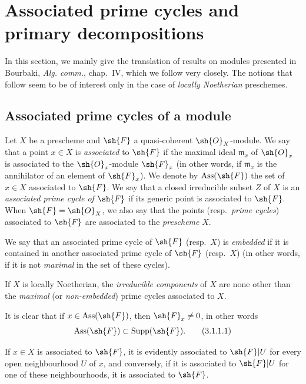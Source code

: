 \section{Associated prime cycles and primary decompositions}
\label{section:IV.3}


In this section, we mainly give the translation of results on modules presented in Bourbaki, \emph{Alg. comm.}, chap.~IV, which we follow very closely.
The notions that follow seem to be of interest only in the case of \emph{locally Noetherian} preschemes.

\subsection{Associated prime cycles of a module}
\label{subsection:IV.3.1}

\begin{definition}[3.1.1]
\label{IV.3.1.1}
Let $X$ be a prescheme and $\sh{F}$ a quasi-coherent $\sh{O}_X$-module.
We say that a point $x\in X$ is \emph{associated} to $\sh{F}$ if the maximal ideal $\mathfrak{m}_x$ of $\sh{O}_x$ is associated to the $\sh{O}_x$-module $\sh{F}_x$ (in other words, if $\mathfrak{m}_x$ is the annihilator of an element of $\sh{F}_x$).
We denote by $\operatorname{Ass}(\sh{F})$ the set of $x\in X$ associated to $\sh{F}$.
We say that a closed irreducible subset $Z$ of $X$ is an \emph{associated prime cycle of $\sh{F}$} if its generic point is associated to $\sh{F}$.
When $\sh{F}=\sh{O}_X$, we also say that the points (resp.\ \emph{prime cycles}) associated to $\sh{F}$ are associated to the \emph{prescheme} $X$.
\end{definition}

We say that an associated prime cycle of $\sh{F}$ (resp.\ $X$) is \emph{embedded} if it is contained in another associated prime cycle of $\sh{F}$ (resp.\ $X$) (in other words, if it is not \emph{maximal} in the set of these cycles).

If $X$ is locally Noetherian, the \emph{irreducible components} of $X$ are none other than the \emph{maximal} (or \emph{non-embedded}) prime cycles associated to $X$.

It is clear that if $x\in\operatorname{Ass}(\sh{F})$, then $\sh{F}_x\neq 0$, in other words
\[
\label{IV.3.1.1.1}
\operatorname{Ass}(\sh{F})\subset\operatorname{Supp}(\sh{F}).
\tag{3.1.1.1}
\]

If $x\in X$ is associated to $\sh{F}$, it is evidently associated to $\sh{F}|U$ for every open neighbourhood $U$ of $x$, and conversely, if it is associated to $\sh{F}|U$ for one of these neighbourhoods, it is associated to $\sh{F}$.

